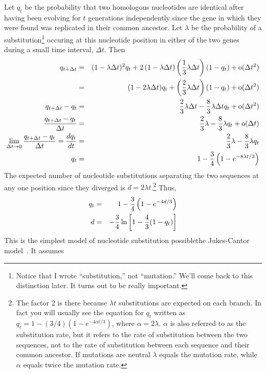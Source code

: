 \documentclass[12pt]{article}
\begin{document}
Let $q_t$ be the probability that two homologous nucleotides are
identical after having been evolving for $t$ generations independently
since the gene in which they were found was replicated in their common
ancestor. Let $\lambda$ be the probability of a
substitution\footnote{Notice that I wrote ``substitution,'' not
  ``mutation.'' We'll come back to this distinction later. It turns
  out to be really important.} occuring
at this nucleotide position in either of the two genes during a small
time interval, $\Delta t$. Then
\begin{eqnarray*}
q_{t+\Delta t} &=& (1 - \lambda\Delta t)^2q_t
                  + 2\left(1 - \lambda\Delta t\right)\left({1 \over
                           3}\lambda\Delta t\right)(1 - q_t)
                  + \hbox{o}(\Delta t^2) \\
               &=& (1 - 2\lambda\Delta t)q_t + \left({2 \over 3}\lambda
                                                    \Delta t\right)
                                              (1 - q_t)
                  + \hbox{o}(\Delta t^2) \\
q_{t+\Delta t} - q_t &=& {2 \over 3}\lambda\Delta t - {8 \over
                           3}\lambda\Delta tq_t + \hbox{o}(\Delta t^2) \\
{q_{t+\Delta t} - q_t \over \Delta t} &=& {2 \over 3}\lambda - {8 \over
3}\lambda q_t + \hbox{o}(\Delta t) \\
\lim_{\Delta t\to 0}{q_{t+\Delta t} - q_t \over \Delta t}  = {dq_t \over dt} &=& {2 \over 3}\lambda - {8
\over 3}\lambda q_t \\
q_t &=& 1 - {3 \over 4}\left(1 - e^{-8\lambda t/3}\right) \\
\end{eqnarray*}
The expected number of nucleotide substitutions separating the two
sequences at any one position since they diverged is $d = 2\lambda
t$.\footnote{The factor 2 is there because $\lambda t$ substitutions
  are expected on each branch. In fact you will usually see the
  equation for $q_t$ written as $q_t = 1 - (3/4)\left(1 - e^{-4\alpha
      t/3}\right)$, where $\alpha = 2\lambda$. $\alpha$ is also
  referred to as the substitution rate, but it refers to the rate of
  substitution between the two sequences, not to the rate of
  substitution between each sequence and their common ancestor. If
  mutations are neutral $\lambda$ equals the mutation rate, while
  $\alpha$ equals twice the mutation rate.} Thus,
\begin{eqnarray*}
q_t &=& 1 - {3 \over 4}\left(1 - e^{-4d/3}\right) \\
d   &=& -{3 \over 4}\ln\left[1 - {4 \over 3}(1 - q_t)\right] \\
\end{eqnarray*}
This is the simplest model of nucleotide substitution
possible{\dash}the Jukes-Cantor model~\cite{Jukes-Cantor-1969}.
It assumes
\end{document}
